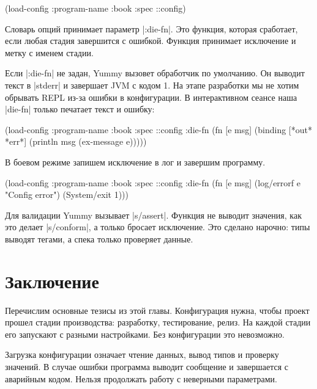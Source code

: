 \begin{english}
  \begin{clojure}
(load-config {:program-name :book
              :spec ::config})
  \end{clojure}
\end{english}

Словарь опций принимает параметр \spverb|:die-fn|. Это функция, которая
сработает, если любая стадия завершится с ошибкой. Функция принимает исключение
и метку с именем стадии.

Если \spverb|:die-fn| не задан, Yummy вызовет обработчик по умолчанию. Он
выводит текст в \spverb|stderr| и завершает JVM с кодом 1. На этапе разработки
мы не хотим обрывать REPL из-за ошибки в конфигурации. В интерактивном сеансе
наша \spverb|die-fn| только печатает текст и ошибку:

\begin{english}
  \begin{clojure}
(load-config
 {:program-name :book
  :spec ::config
  :die-fn (fn [e msg]
            (binding [*out* *err*]
              (println msg (ex-message e))))})
  \end{clojure}
\end{english}

\noindent
В боевом режиме запишем исключение в лог и завершим программу.

\begin{english}
  \begin{clojure}
(load-config
 {:program-name :book
  :spec ::config
  :die-fn (fn [e msg]
            (log/errorf e "Config error")
            (System/exit 1))})
  \end{clojure}
\end{english}

Для валидации Yummy вызывает \spverb|s/assert|. Функция не выводит значения, как
это делает \spverb|s/conform|, а только бросает исключение. Это сделано нарочно:
типы выводят тегами, а спека только проверяет данные.

\section{Заключение}

Перечислим основные тезисы из этой главы. Конфигурация нужна, чтобы проект
прошел стадии производства: разработку, тестирование, релиз. На каждой стадии
его запускают с разными настройками. Без конфигурации это невозможно.

Загрузка конфигурации означает чтение данных, вывод типов и проверку значений. В
случае ошибки программа выводит сообщение и завершается с аварийным
кодом. Нельзя продолжать работу с неверными параметрами.

